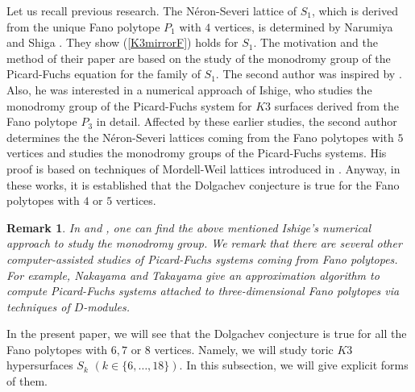 \documentclass[10pt]{article}
\newtheorem{rem}{Remark}[section]
\begin{document}
Let us recall  previous research.
The N\'eron-Severi lattice  of $S_1$, which is derived from the unique Fano polytope $P_1$ with $4$ vertices,
is determined by Narumiya and Shiga \cite{NS}. 
They show (\ref{K3mirrorF}) holds for $S_1$.
The motivation and the method of their paper are based on the study of the monodromy group of the Picard-Fuchs equation for the family of $S_1$.
The second author was inspired by \cite{NS}. 
Also, he was interested in a numerical approach of  Ishige,
 who studies the monodromy group of the Picard-Fuchs system for $K3$ surfaces derived from the Fano polytope  $P_3$ in detail.
Affected by these earlier studies,
 the second author \cite{Na}  determines the the N\'eron-Severi lattices coming from the Fano polytopes with $5$ vertices 
and studies the monodromy groups of the Picard-Fuchs systems.
His proof is based on techniques of Mordell-Weil lattices introduced in \cite{Shioda}.
Anyway,
in these works,
it is established  that the Dolgachev conjecture is true for the Fano polytopes with $4$ or $5$ vertices.

\begin{rem}
In  \cite{I} and \cite{IIT},
one can find the above mentioned Ishige's numerical approach to study the monodromy group.
We remark that there are several other computer-assisted studies of Picard-Fuchs systems coming from Fano polytopes.
For example,
Nakayama and Takayama \cite{NT} 
give an approximation algorithm to compute 
 Picard-Fuchs systems attached to  three-dimensional Fano polytopes 
via techniques of $D$-modules.
\end{rem}


In the present paper,
we will see that the Dolgachev conjecture is true for all the Fano polytopes with $6,7$ or $8$ vertices.
Namely, we will study toric $K3$ hypersurfaces $S_k$ $(k\in \{6,\ldots, 18\}).$
In this subsection, we will give explicit forms  of them.
\end{document}
